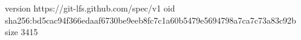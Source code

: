 version https://git-lfs.github.com/spec/v1
oid sha256:bd5cac94f366edaaf6730be9eeb8fc7c1a60b5479e5694798a7ca7c73a83c92b
size 3415
